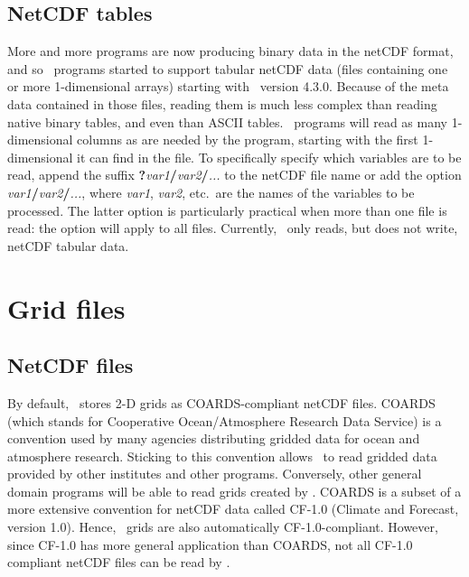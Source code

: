 \subsection{NetCDF tables}

More and more programs are now producing binary data in the netCDF format, and so \GMT\ programs
started to support tabular netCDF data (files containing one or more 1-dimensional arrays) starting with \GMT\ version 4.3.0.
Because of the meta data contained in those files, reading them is much less complex than reading native binary tables,
and even than ASCII tables. \GMT\ programs will read as many 1-dimensional columns as are needed by the program, starting with the first
1-dimensional it can find in the file. To specifically specify which variables are to be read,
append the suffix \textbf{?}\emph{var1}\textbf{/}\emph{var2}\textbf{/}\emph{...} to the netCDF file name
or add the option \emph{var1}\textbf{/}\emph{var2}\textbf{/}\emph{...}, where \emph{var1}, \emph{var2}, etc.\
are the names of the variables to be processed. The latter option is particularly practical when more
than one file is read: the \Opt{bic} option will apply to all files.
Currently, \GMT\ only reads, but does not write, netCDF tabular data.

\section{Grid files}

\subsection{NetCDF files}

By default, \GMT\ stores 2-D grids as COARDS-compliant netCDF files.
COARDS (which stands for Cooperative Ocean/Atmosphere Research Data Service) is a convention used by
many agencies distributing gridded data for ocean and atmosphere research. Sticking to
this convention allows \GMT\ to read gridded data provided by other institutes
and other programs. Conversely, other general domain programs
will be able to read grids created by \GMT.
COARDS is a subset of a more extensive convention for netCDF data called CF-1.0 (Climate and
Forecast, version 1.0). Hence, \GMT\ grids are also automatically CF-1.0-compliant.
However, since CF-1.0 has more general application than COARDS, not all CF-1.0 compliant netCDF files
can be read by \GMT.

